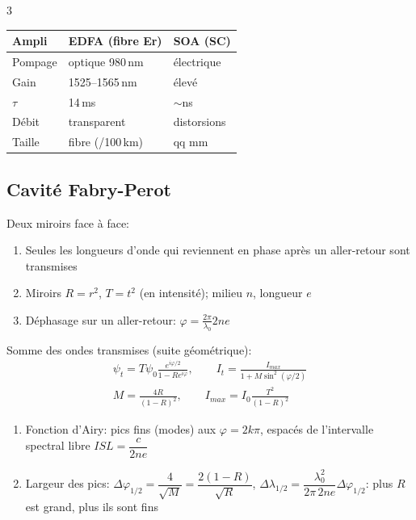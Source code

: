 \documentclass[12pt, a4paper]{article}
\begin{document}
\begin{multicols*}{3}
	\begin{tabular}{|l|l|l|}
		\hline
		\textbf{Ampli} & \textbf{EDFA} (fibre Er) & \textbf{SOA} (SC) \\
		\hline
		Pompage        & optique 980\,nm          & électrique        \\
		Gain           & 1525--1565\,nm           & élevé             \\
		$\tau$         & 14\,ms                   & $\sim$ns          \\
		Débit          & transparent              & distorsions       \\
		Taille         & fibre (/100\,km)         & qq mm             \\
		\hline
	\end{tabular}

	\subsection{Cavité Fabry-Perot}
	Deux miroirs face à face:
	\begin{enumerate}[\roman*.]
		\item Seules les longueurs d'onde qui reviennent en phase après un aller-retour sont transmises
		\item Miroirs $R=r^2$, $T=t^2$ (en intensité); milieu $n$, longueur $e$
		\item Déphasage sur un aller-retour: $\varphi=\frac{2\pi}{\lambda_0}2ne$
	\end{enumerate}

	\colbreak
	Somme des ondes transmises (suite géométrique):
	\begin{gather*}
		\psi_t=T\psi_0\frac{e^{i\varphi/2}}{1-Re^{i\varphi}},\qquad I_t=\frac{I_{max}}{1+M\sin^2(\varphi/2)}\\
		M=\frac{4R}{(1-R)^2},\qquad I_{max}=I_0\frac{T^2}{(1-R)^2}
	\end{gather*}
	\begin{enumerate}[\roman*.]
		\item Fonction d'Airy: pics fins (modes) aux $\varphi=2k\pi$, espacés de l'intervalle spectral libre $ISL=\dfrac{c}{2ne}$
		\item Largeur des pics: $\Delta\varphi_{1/2}=\dfrac{4}{\sqrt M}=\dfrac{2(1-R)}{\sqrt R}$, $\Delta\lambda_{1/2}=\dfrac{\lambda_0^2}{2\pi\,2ne}\Delta\varphi_{1/2}$: plus $R$ est grand, plus ils sont fins
	\end{enumerate}


\end{multicols*}
\end{document}
